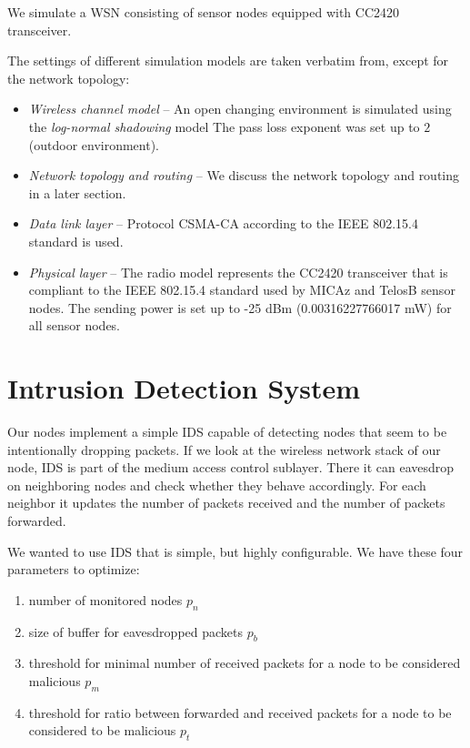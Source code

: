 \documentclass[12pt,oneside]{fithesis2}
\begin{document}
We simulate a WSN consisting of sensor nodes equipped with CC2420 transceiver.

The settings of different simulation models are taken verbatim from\cite{stehl2013opt}, except for the network topology:
\begin{itemize}
\item \textit{Wireless channel model} -- An open changing environment is simulated using the \textit{log-normal shadowing} model \cite{R01}  The pass loss exponent was set up to $2$ (outdoor environment). 

\item \textit{Network topology and routing} -- We discuss the network topology and routing in a later section.

\item \textit{Data link layer} -- Protocol CSMA-CA according to the IEEE 802.15.4 standard is used.

\item \textit{Physical layer} -- The radio model represents the CC2420 transceiver that is compliant to the IEEE 802.15.4 standard used by MICAz and TelosB sensor nodes. The sending power is set up to -25 dBm (0.00316227766017 mW) for all sensor nodes.
\end{itemize}



\section{Intrusion Detection System}
Our nodes implement a simple IDS capable of detecting nodes that seem to be intentionally dropping packets.
If we look at the wireless network stack of our node, IDS is part of the medium access control sublayer.
There it can eavesdrop on neighboring nodes and check whether they behave accordingly.
For each neighbor it updates the number of packets received and the number of packets forwarded.

We wanted to use IDS that is simple, but highly configurable. 
We have these four parameters to optimize:
\begin{enumerate}
\item number of monitored nodes $p_n$
\item size of buffer for eavesdropped packets $p_b$
\item threshold for minimal number of received packets for a node to be considered malicious $p_m$
\item threshold for ratio between forwarded and received packets for a node to be considered to be malicious $p_t$
\end{enumerate}
\end{document}
